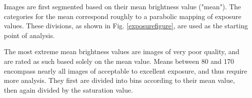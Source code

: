 \documentclass{article}
\begin{document}
Images are first segmented based on their mean brightness value ("mean"). The categories for the mean correspond roughly to a parabolic mapping of exposure values. These divisions, as shown in Fig. \ref{exposurefigure}, are used as the starting point of analysis. %





The most extreme mean brightness values are images of very poor quality, and are rated as such based solely on the mean value. Means between 80 and 170 encompass nearly all images of acceptable to excellent exposure, and thus require more analysis. They first are divided into bins according to their mean value, then again divided by the saturation value.
\end{document}
